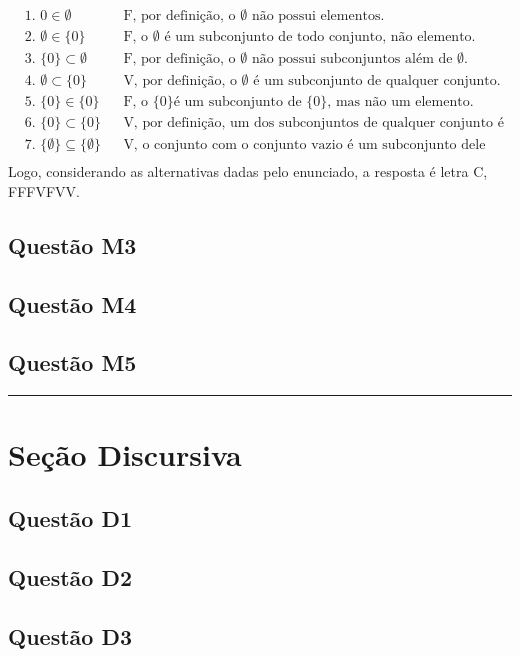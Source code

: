 \documentclass{article}
\begin{document}
\[
\begin{aligned}
& \text{1. } 0 \in \emptyset &&\text{F, por definição, o $\emptyset$ não possui elementos.} \\
& \text{2. } \emptyset \in \{0\} &&\text{F, o $\emptyset$ é um subconjunto de todo conjunto, não elemento.}\\
& \text{3. } \{0\} \subset \emptyset &&\text{F, por definição, o $\emptyset$ não possui subconjuntos além de $\emptyset$.} \\
& \text{4. } \emptyset \subset \{0\} &&\text{V, por definição, o $\emptyset$ é um subconjunto de qualquer conjunto.} \\
& \text{5. } \{0\} \in \{0\} &&\text{F, o \{0\} é um subconjunto de \{0\}, mas não um elemento.} \\
& \text{6. } \{0\} \subset \{0\} &&\text{V, por definição, um dos subconjuntos de qualquer conjunto é ele mesmo.} \\
& \text{7. } \{\emptyset\} \subseteq \{\emptyset\} &&\text{V, o conjunto com o conjunto vazio é um subconjunto dele mesmo.} \\
\end{aligned}
\]
Logo, considerando as alternativas dadas pelo enunciado, a resposta é letra C, FFFVFVV.

\subsection{Questão M3}
\subsection{Questão M4}
\subsection{Questão M5}

\vspace{0.5em}
\hrule
\vspace{0.5em}

\section{Seção Discursiva}

\subsection{Questão D1}
\subsection{Questão D2}
\subsection{Questão D3}
\end{document}
